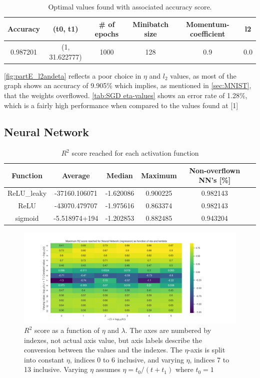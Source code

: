 \documentclass[a4paper, UKenglish]{article}
\newcommand{\0}{\mathbf{0}}
\newcommand{\1}{\mathbf{1}}
\begin{document}
\begin{table}[H] 
\centering
\caption{Optimal values found with associated accuracy score.}
\label{tab:LogReg optimal values}
\begin{tabular}{|c|c|c|c|c|c|}
	\hline
  Accuracy & (t0, t1) & \# of epochs & Minibatch size & Momentum-coefficient & l2
  \\
  \hline
  0.987201 & (1, 31.622777) & 1000 & 128 & 0.9 & 0.0 \\
	\hline
\end{tabular}
\end{table}



\autoref{fig:partE_l2andeta} reflects a poor choice in $\eta$ and $l_2$ values, as most of the graph shows an accuracy of 9.905\% which implies, as mentioned in \autoref{sec:MNIST}, that the weights overflowed. \autoref{tab:SGD eta-values} shows an error rate of 1.28\%, which is a fairly high performance when compared to the values found at [1]



\subsection{Neural Network} \label{sec:NN results}
\begin{table}[H] 
\centering
\caption{$R^2$ score reached for each activation function}
\label{tab:activation functions}
\begin{tabular}{|c|c|c|c|c|c|}
  \hline
  Function & Average & Median & Maximum & Non-overflown NN's [\%] \\
  \hline
  ReLU\_leaky &-37160.106071 & -1.620086 & 0.900225 & 0.982143 \\
  ReLU        &-43070.479707 & -1.975616 & 0.863374 & 0.982143 \\
  sigmoid     &-5.518974+194 & -1.202853 & 0.882485 & 0.943204 \\
  \hline
\end{tabular}
\end{table}


\begin{figure}[H]
        \centering 
        \includegraphics[scale=0.6]{images/partB.png} 
        \caption{$R^2$ score as a function of $\eta$ and $\lambda$. The axes are numbered by indexes, not actual axis value, but axis labels describe the conversion between the values and the indexes. The $\eta$-axis is split into constant $\eta$, indices 0 to 6 inclusive, and varying $\eta$, indices 7 to 13 inclusive. Varying $\eta$ assumes $\eta = t_0/(t+t_1)$ where $t_0=1$}
        \label{fig:covers the page}
\end{figure}
\end{document}
